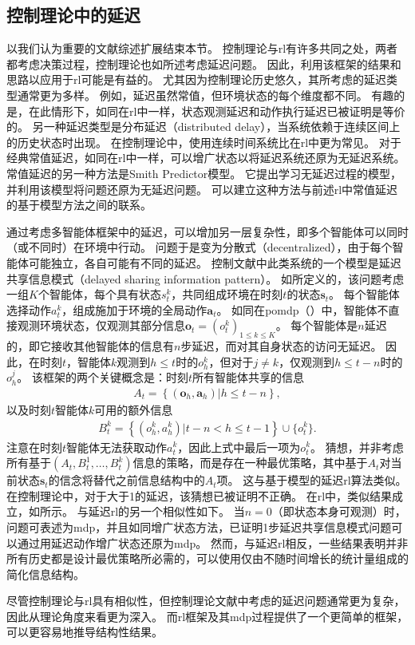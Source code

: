 \subsection{控制理论中的延迟}
\label{subsec:control_theory}
以我们认为重要的文献综述扩展结束本节。
控制理论与\gls{rl}有许多共同之处，两者都考虑决策过程，控制理论也如所述考虑延迟问题。
因此，利用该框架的结果和思路以应用于\gls{rl}可能是有益的。
尤其因为控制理论历史悠久，其所考虑的延迟类型通常更为多样。
例如，延迟虽然常值，但环境状态的每个维度都不同\cite{alevisakis1973extension, altman1999congestion}。
有趣的是，在此情形下，如同在\gls{rl}中一样，状态观测延迟和动作执行延迟已被证明是等价的。
另一种延迟类型是分布延迟（distributed delay），当系统依赖于连续区间上的历史状态时出现\cite{gu2003survey}。
在控制理论中，使用连续时间系统比在\gls{rl}中更为常见。
对于经典常值延迟，如同在\gls{rl}中一样，可以增广状态以将延迟系统还原为无延迟系统\cite{kwon2003simple}。
常值延迟的另一种方法是Smith Predictor模型\cite{smith1957closer}。
它提出学习无延迟过程的模型，并利用该模型将问题还原为无延迟问题。
可以建立这种方法与前述\gls{rl}中常值延迟的基于模型方法之间的联系。

通过考虑多智能体框架中的延迟，可以增加另一层复杂性，即多个智能体可以同时（或不同时）在环境中行动。
问题于是变为分散式（decentralized），由于每个智能体可能独立，各自可能有不同的延迟。
控制文献中此类系统的一个模型是延迟共享信息模式（delayed sharing information pattern）。
如\cite{witsenhausen1971separation}所定义的，该问题考虑一组$K$个智能体，每个具有状态$s_t^k$，共同组成环境在时刻$t$的状态$\boldsymbol s_t$。
每个智能体选择动作$a_t^k$，组成施加于环境的全局动作$\boldsymbol a_t$。
如同在\gls{pomdp}（）中，智能体不直接观测环境状态，仅观测其部分信息$\boldsymbol o_t = (o_t^k)_{1\le k \le K}$。
每个智能体是$n$延迟的，即它接收其他智能体的信息有$n$步延迟，而对其自身状态的访问无延迟。
因此，在时刻$t$，智能体$k$观测到$h\le t$时的$o_h^k$，但对于$j\ne k$，仅观测到$h\le t-n$时的$o_h^j$。
该框架的两个关键概念是：时刻$t$所有智能体共享的信息
\begin{align*}
    A_t = \left\{ (\boldsymbol o_h, \boldsymbol a_h)\vert h\le t-n \right\},
\end{align*}
以及时刻$t$智能体$k$可用的额外信息
\begin{align*}
    B_t^k = \left\{ ( o_h^k,  a_h^k)\vert t-n<h\le t-1 \right\} \cup \{ o_t^k\}.
\end{align*}
注意在时刻$t$智能体无法获取动作$a_t^k$，因此上式中最后一项为$o_t^k$。
\cite{witsenhausen1971separation}猜想，并非考虑所有基于$(A_t,B_t^1,\dots,B_t^k)$信息的策略，而是存在一种最优策略，其中基于$A_t$对当前状态$\boldsymbol s_t$的信念将替代之前信息结构中的$A_t$项。
这与基于模型的延迟\gls{rl}算法类似。
在控制理论中，对于大于1的延迟，该猜想已被\cite{varaiya1978delayed}证明不正确。
在\gls{rl}中，类似结果成立，如所示。
与延迟\gls{rl}的另一个相似性如下。
当$n=0$（即状态本身可观测）时，问题可表述为\gls{mdp}，并且如同增广状态方法，已证明1步延迟共享信息模式问题可以通过用延迟动作增广状态还原为\gls{mdp}\cite{hsu1982decentralized}。
然而，与延迟\gls{rl}相反，一些结果表明并非所有历史都是设计最优策略所必需的，可以使用仅由不随时间增长的统计量组成的简化信息结构\cite{altman2009stochastic,nayyar2010optimal}。

尽管控制理论与\gls{rl}具有相似性，但控制理论文献中考虑的延迟问题通常更为复杂，因此从理论角度来看更为深入。
而\gls{rl}框架及其\gls{mdp}过程提供了一个更简单的框架，可以更容易地推导结构性结果。